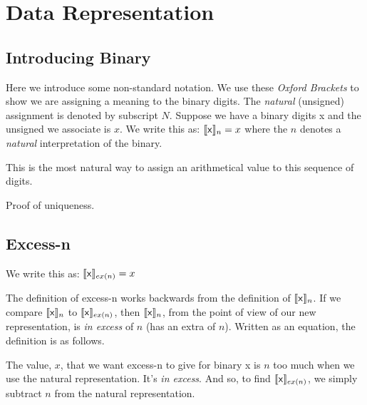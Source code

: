 

\chapter{Data Representation}


\section{Introducing Binary}



Here we introduce some non-standard notation. 
We use these \textit{Oxford Brackets} 
to show we are assigning a meaning to the binary digits. 
The \textit{natural} (unsigned) assignment is denoted by subscript $N$. 
Suppose we have a binary digits \textsf{x} and the unsigned we associate is $x$.
We write this as: $\llbracket \text{\textsf{x}} \rrbracket_{n} = x$
where the $n$ denotes a \textit{natural} interpretation of the binary. 


This is the most natural way to assign an 
arithmetical value to this sequence of digits. 

\frmrule

Proof of uniqueness.

\frmrule



\section{Excess-n}

We write this as: $\llbracket \text{\textsf{x}} \rrbracket_{ex(n)} = x$

The definition of excess-n works backwards from the definition 
of $\llbracket \text{\textsf{x}} \rrbracket_{n}$. 
If we compare $\llbracket \text{\textsf{x}} \rrbracket_{n}$ 
to $\llbracket \text{\textsf{x}} \rrbracket_{ex(n)}$,
then $\llbracket \text{\textsf{x}} \rrbracket_{n}$, from the point of view 
of our new representation, is \textit{in excess} of $n$ 
(has an extra of $n$). Written as an equation, the definition is as follows.


The value, $x$, that we want excess-n to give for binary \textsf{x} 
is $n$ too much when we use the natural representation. It's \textit{in excess}. 
And so, to find $\llbracket \text{\textsf{x}} \rrbracket_{ex(n)}$, 
we simply subtract $n$ from the natural representation. 

